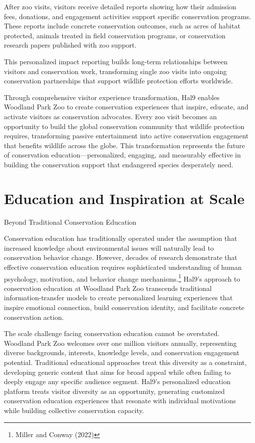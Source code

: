\documentclass[
  Letterpaper,
]{scrbook}
\begin{document}
After zoo visits, visitors receive detailed reports showing how their
admission fees, donations, and engagement activities support specific
conservation programs. These reports include concrete conservation
outcomes, such as acres of habitat protected, animals treated in field
conservation programs, or conservation research papers published with
zoo support.

This personalized impact reporting builds long-term relationships
between visitors and conservation work, transforming single zoo visits
into ongoing conservation partnerships that support wildlife protection
efforts worldwide.

Through comprehensive visitor experience transformation, Hal9 enables
Woodland Park Zoo to create conservation experiences that inspire,
educate, and activate visitors as conservation advocates. Every zoo
visit becomes an opportunity to build the global conservation community
that wildlife protection requires, transforming passive entertainment
into active conservation engagement that benefits wildlife across the
globe. This transformation represents the future of conservation
education---personalized, engaging, and measurably effective in building
the conservation support that endangered species desperately need.


\chapter{Education and Inspiration at
Scale}\label{education-and-inspiration-at-scale}

Beyond Traditional Conservation Education

\hfill\break

Conservation education has traditionally operated under the assumption
that increased knowledge about environmental issues will naturally lead
to conservation behavior change. However, decades of research
demonstrate that effective conservation education requires sophisticated
understanding of human psychology, motivation, and behavior change
mechanisms.\footnote{Miller and Conway (2022)} Hal9's approach to
conservation education at Woodland Park Zoo transcends traditional
information-transfer models to create personalized learning experiences
that inspire emotional connection, build conservation identity, and
facilitate concrete conservation action.

The scale challenge facing conservation education cannot be overstated.
Woodland Park Zoo welcomes over one million visitors annually,
representing diverse backgrounds, interests, knowledge levels, and
conservation engagement potential. Traditional educational approaches
treat this diversity as a constraint, developing generic content that
aims for broad appeal while often failing to deeply engage any specific
audience segment. Hal9's personalized education platform treats visitor
diversity as an opportunity, generating customized conservation
education experiences that resonate with individual motivations while
building collective conservation capacity.
\end{document}
